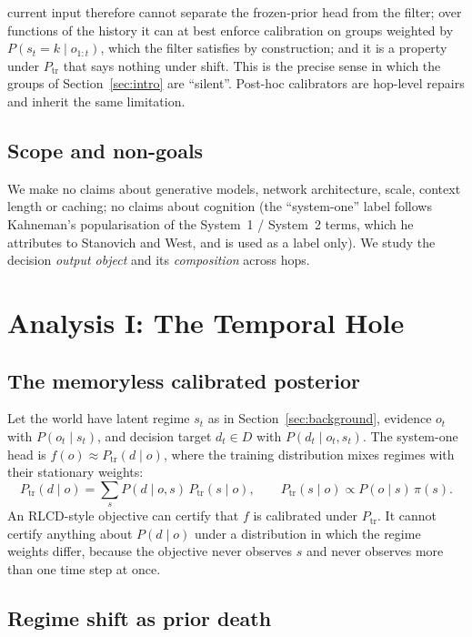 \documentclass[11pt,a4paper]{article}
\numberwithin{equation}{section}
\theoremstyle{plain}
\theoremstyle{definition}
\theoremstyle{remark}
\newcommand{\ptrain}{P_{\mathrm{tr}}}
\begin{document}
current input therefore cannot separate the frozen-prior head from the filter; over functions of the history it can at best enforce calibration on groups weighted by $P(s_t=k\mid o_{1:t})$, which the filter satisfies by construction; and it is a property under $\ptrain$ that says nothing under shift. This is the precise sense in which the groups of Section~\ref{sec:intro} are ``silent''. Post-hoc calibrators \citep{guo2017,kull2019} are hop-level repairs and inherit the same limitation.

\subsection{Scope and non-goals}

We make no claims about generative models, network architecture, scale, context length or caching; no claims about cognition (the ``system-one'' label follows Kahneman's popularisation \citep{kahneman2011} of the System~1 / System~2 terms, which he attributes to Stanovich and West, and is used as a label only). We study the decision \emph{output object} and its \emph{composition} across hops.

\section{Analysis I: The Temporal Hole}\label{sec:temporal}

\subsection{The memoryless calibrated posterior}

Let the world have latent regime $s_t$ as in Section~\ref{sec:background}, evidence $o_t$ with $P(o_t\mid s_t)$, and decision target $d_t \in D$ with $P(d_t \mid o_t, s_t)$. The system-one head is $f(o) \approx \ptrain(d\mid o)$, where the training distribution mixes regimes with their stationary weights:
\begin{equation}\label{eq:ptrain}
\ptrain(d\mid o) = \sum_s P(d\mid o,s)\,\ptrain(s\mid o),\qquad \ptrain(s\mid o) \propto P(o\mid s)\,\pi(s).
\end{equation}
An RLCD-style objective can certify that $f$ is calibrated under $\ptrain$. It cannot certify anything about $P(d\mid o)$ under a distribution in which the regime weights differ, because the objective never observes $s$ and never observes more than one time step at once.

\subsection{Regime shift as prior death}
\end{document}
